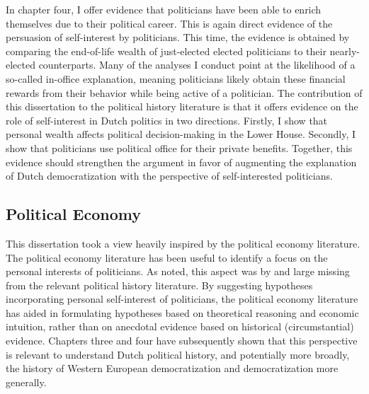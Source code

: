 In chapter four, I offer evidence that politicians have been able to enrich themselves due to their political career. This is again direct evidence of the persuasion of self-interest by politicians. This time, the evidence is obtained by comparing the end-of-life wealth of just-elected elected politicians to their nearly-elected counterparts. Many of the analyses I conduct point at the likelihood of a so-called in-office explanation, meaning politicians likely obtain these financial rewards from their behavior while being active of a politician. The contribution of this dissertation to the political history literature is that it offers evidence on the role of self-interest in Dutch politics in two directions. Firstly, I show that personal wealth affects political decision-making in the Lower House. Secondly, I show that politicians use political office for their private benefits. Together, this evidence should strengthen the argument in favor of augmenting the explanation of Dutch democratization with the perspective of self-interested politicians. 


\subsection{Political Economy}

This dissertation took a view heavily inspired by the political economy literature. The political economy literature has been useful to identify a focus on the personal interests of politicians. As noted, this aspect was by and large missing from the relevant political history literature. By suggesting hypotheses incorporating personal self-interest of politicians, the political economy literature has aided in formulating hypotheses based on theoretical reasoning and economic intuition, rather than on anecdotal evidence based on historical (circumstantial) evidence. Chapters three and four have subsequently shown that this perspective is relevant to understand Dutch political history, and potentially more broadly, the history of Western European democratization and democratization more generally. 

